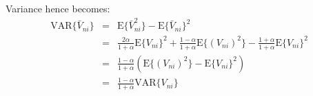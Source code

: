 Variance hence becomes:
\begin{eqnarray*}
\text{VAR}\{\bar{V}_{ni}\} & = & \text{E}\{\bar{V}_{ni}^{2}\}-\text{E}\{\bar{V}_{ni}\}^{2}\\
 & = & \frac{2\alpha}{1+\alpha}\text{E}\{V_{ni}\}^{2}+\frac{1-\alpha}{1+\alpha}\text{E}\{(V_{ni})^{2}\}-\frac{1+\alpha}{1+\alpha}\text{E}\{V_{ni}\}^{2}\\
 & = & \frac{1-\alpha}{1+\alpha}\left(\text{E}\{(V_{ni})^{2}\}-\text{E}\{V_{ni}\}^{2}\right)\\
 & = & \frac{1-\alpha}{1+\alpha}\text{VAR}\{V_{ni}\}
\end{eqnarray*}

